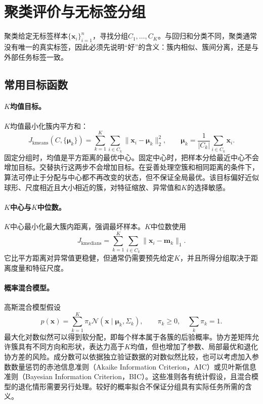 \section{聚类评价与无标签分组}
聚类给定无标签样本$\{\bm x_i\}_{i=1}^n$，寻找分组$C_1,\ldots,C_K$。与回归和分类不同，聚类通常没有唯一的真实标签，因此必须先说明“好”的含义：簇内相似、簇间分离，还是与外部任务标签一致。

\subsection{常用目标函数}
\paragraph{$K$均值目标。}
$K$均值最小化簇内平方和：
\begin{equation}
 J_{\mathrm{kmeans}}(C,\{\bm\mu_k\})=
 \sum_{k=1}^K\sum_{i\in C_k}\|\bm x_i-\bm\mu_k\|_2^2,
 \qquad
 \bm\mu_k=\frac1{|C_k|}\sum_{i\in C_k}\bm x_i.
 \label{eq:clustering-kmeans}
\end{equation}
固定分组时，均值是平方距离的最优中心。固定中心时，把样本分给最近中心不会增加目标。交替执行这两步不会增加目标。在妥善处理空簇和相同距离的条件下，算法可停止于分配与中心都不再改变的状态，但不保证全局最优。该目标偏好近似球形、尺度相近且大小相近的簇，对特征缩放、异常值和$K$的选择敏感。

\paragraph{$K$中心与$K$中位数。}
$K$中心最小化最大簇内距离，强调最坏样本。$K$中位数使用
\begin{equation}
 J_{\mathrm{kmedians}}=\sum_{k=1}^K\sum_{i\in C_k}\|\bm x_i-\bm m_k\|_1.
 \label{eq:clustering-kmedians}
\end{equation}
它比平方距离对异常值更稳健，但通常仍需要预先给定$K$，并且所得分组取决于距离度量和特征尺度。

\paragraph{概率混合模型。}
高斯混合模型假设
\begin{equation}
 p(\bm x)=\sum_{k=1}^K\pi_k\mathcal N(\bm x\mid\bm\mu_k,\Sigma_k),
 \qquad \pi_k\geq0,\quad\sum_k\pi_k=1.
 \label{eq:clustering-gmm}
\end{equation}
最大化对数似然可以得到软分配，即每个样本属于各簇的后验概率。协方差矩阵允许簇具有不同方向和形状，表达力高于$K$均值，但也增加了参数、局部最优和退化协方差的风险。成分数可以依据独立验证数据的对数似然比较，也可以考虑加入参数数量惩罚的赤池信息准则（Akaike Information Criterion，AIC）或贝叶斯信息准则（Bayesian Information Criterion，BIC）。这些准则各有统计假设，且混合模型的退化情形需要另行处理。较好的概率拟合不保证分组具有实际任务所需的含义。

